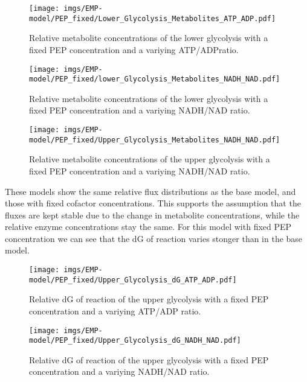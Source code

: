 \begin{figure}[H]
    \centering
    \texttt{[image: imgs/EMP-model/PEP\_fixed/Lower\_Glycolysis\_Metabolites\_ATP\_ADP.pdf]}
    \caption{Relative metabolite concentrations of the lower glycolysis with a fixed PEP concentration and a variying ATP/ADPratio.}
    \label{fig:lower_metabolites_pep_fixed_atp}
\end{figure}

\begin{figure}[H]
    \centering
    \texttt{[image: imgs/EMP-model/PEP\_fixed/lower\_Glycolysis\_Metabolites\_NADH\_NAD.pdf]}
    \caption{Relative metabolite concentrations of the lower glycolysis with a fixed PEP concentration and a variying NADH/NAD ratio.}
    \label{fig:lower_metabolites_pep_fixed_nadh}
\end{figure}

\begin{figure}[H]
    \centering
    \texttt{[image: imgs/EMP-model/PEP\_fixed/Upper\_Glycolysis\_Metabolites\_NADH\_NAD.pdf]}
    \caption{Relative metabolite concentrations of the upper glycolysis with a fixed PEP concentration and a variying NADH/NAD ratio.}
    \label{fig:upper_metabolite_pep_fixed_nadh}
\end{figure}

These models show the same relative flux distributions as the base model, and those with fixed cofactor concentrations. This supports the assumption that the fluxes are kept stable due to the change in metabolite concentrations, while the relative enzyme concentrations stay the same.
For this model with fixed PEP concentration we can see that the dG of reaction varies stonger than in the base model.
\begin{figure}[H]
    \centering
    \texttt{[image: imgs/EMP-model/PEP\_fixed/Upper\_Glycolysis\_dG\_ATP\_ADP.pdf]}
    \caption{Relative dG of reaction of the upper glycolysis with a fixed PEP concentration and a variying ATP/ADP ratio.}
    \label{fig:upper_dG_pep_fixed_atp}
\end{figure}

\begin{figure}[H]
    \centering
    \texttt{[image: imgs/EMP-model/PEP\_fixed/Upper\_Glycolysis\_dG\_NADH\_NAD.pdf]}
    \caption{Relative dG of reaction of the upper glycolysis with a fixed PEP concentration and a variying NADH/NAD ratio.}
    \label{fig:upper_dG_pep_fixed_nadh}
\end{figure}

